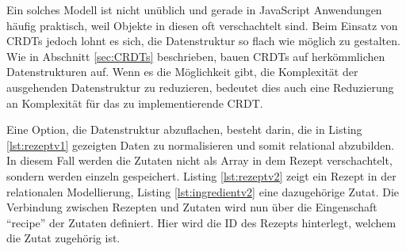 \documentclass[a4paper, 12pt]{scrreprt}
\begin{document}


\begin{minipage}{\linewidth}
	
\end{minipage} 

Ein solches Modell ist nicht unüblich und gerade in JavaScript Anwendungen häufig praktisch, weil Objekte in diesen oft verschachtelt sind. Beim Einsatz von \acp{CRDT} jedoch lohnt es sich, die Datenstruktur so flach wie möglich zu gestalten. Wie in Abschnitt \ref{sec:CRDTs} beschrieben, bauen \acp{CRDT} auf herkömmlichen Datenstrukturen auf. Wenn es die Möglichkeit gibt, die Komplexität der ausgehenden Datenstruktur zu reduzieren, bedeutet dies auch eine Reduzierung an Komplexität für das zu implementierende CRDT.

Eine Option, die Datenstruktur abzuflachen, besteht darin, die in Listing \ref{lst:rezeptv1} gezeigten Daten zu normalisieren und somit relational abzubilden. In diesem Fall werden die Zutaten nicht als Array in dem Rezept verschachtelt, sondern werden einzeln gespeichert. Listing \ref{lst:rezeptv2} zeigt ein Rezept in der relationalen Modellierung, Listing \ref{lst:ingredientv2} eine dazugehörige Zutat. Die Verbindung zwischen Rezepten und Zutaten wird nun über die Eingenschaft \enquote{recipe} der Zutaten definiert. Hier wird die ID des Rezepts hinterlegt, welchem die Zutat zugehörig ist.


\begin{minipage}{\linewidth}
	
\end{minipage}
\end{document}

